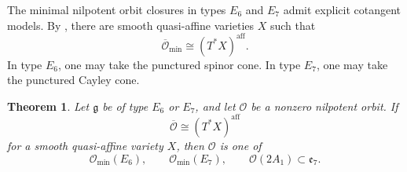 \documentclass[10pt,a4paper]{amsart}
\newtheorem{theorem}{Theorem}[section]
\newcommand{\aff}{\mathrm{aff}}
\begin{document}
The minimal nilpotent orbit closures in types $E_6$ and $E_7$ admit
explicit cotangent models.
By \cite[Theorem 1.4 and Table 2]{FuLiu}, there are smooth quasi-affine
varieties $X$ such that
\[
\overline{\mathcal O}_{\min}\cong(T^*X)^{\aff}.
\]
In type $E_6$, one may take the punctured spinor cone.
In type $E_7$, one may take the punctured Cayley cone.

\begin{theorem}\label{thm:E6E7}
Let $\mathfrak g$ be of type $E_6$ or $E_7$, and let $\mathcal O$ be a
nonzero nilpotent orbit. If
\[
\overline{\mathcal O}\cong(T^*X)^{\aff}
\]
for a smooth quasi-affine variety $X$, then $\mathcal O$ is one of
\[
\mathcal O_{\min}(E_6),\qquad
\mathcal O_{\min}(E_7),\qquad
\mathcal O(2A_1)\subset\mathfrak e_7.
\]
\end{theorem}
\end{document}
